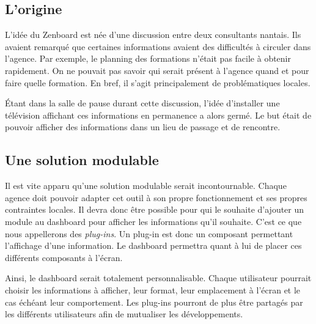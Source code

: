\subsection{L'origine}

L'idée du Zenboard est née d'une discussion entre deux consultants nantais. Ils avaient remarqué que certaines informations avaient des difficultés à circuler dans l'agence. Par exemple, le planning des formations n'était pas facile à obtenir rapidement. On ne pouvait pas savoir qui serait présent à l'agence quand et pour faire quelle formation. En bref, il s'agit principalement de problématiques locales. 

Étant dans la salle de pause durant cette discussion, l'idée d'installer une télévision affichant ces informations en permanence a alors germé. Le but était de pouvoir afficher des informations dans un lieu de passage et de rencontre. 

\subsection{Une solution modulable}

Il est vite apparu qu'une solution modulable serait incontournable. Chaque agence doit pouvoir adapter cet outil à son propre fonctionnement et ses propres contraintes locales. Il devra donc être possible pour qui le souhaite d'ajouter un module au dashboard pour afficher les informations qu'il souhaite. C'est ce que nous appellerons des \textit{plug-ins}. Un plug-in est donc un composant permettant l'affichage d'une information. Le dashboard permettra quant à lui de placer ces différents composants à l'écran.

Ainsi, le dashboard serait totalement personnalisable. Chaque utilisateur pourrait choisir les informations à afficher, leur format, leur emplacement à l'écran et le cas échéant leur comportement. Les plug-ins pourront de plus être partagés par les différents utilisateurs afin de mutualiser les développements.

\clearpage